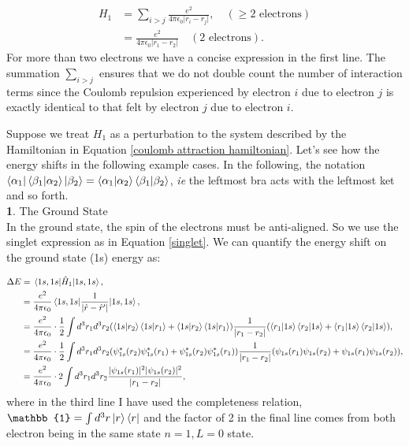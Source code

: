 \documentclass{article}
\numberwithin{equation}{section} %
\begin{document}
\begin{equation}
\begin{split}
H_1&=\sum_{i>j} \frac{e^2}{4\pi\epsilon_0\vert r_i-r_j\vert}, \quad (\geq \text{2 electrons})\\
&= \frac{e^2}{4\pi\epsilon_0\vert r_1-r_2\vert} \quad (\text{2 electrons}).
\end{split}
\end{equation}
For more than two electrons we have a concise expression in the first line. The summation $\sum_{i>j}$ ensures that we do not double count the number of interaction terms since the Coulomb repulsion experienced by electron $i$ due to electron $j$ is exactly identical to that felt by electron $j$ due to electron $i$.

Suppose we treat $H_1$ as a perturbation to the system described by the Hamiltonian in Equation \ref{coulomb attraction hamiltonian}. Let's see how the energy shifts in the following example cases. In the following, the notation $\bra{\alpha_1}\bra{\beta_1} \ket{\alpha_2}\ket{\beta_2} = \bra{\alpha_1}\ket{\alpha_2}\bra{\beta_1}\ket{\beta_2}$, \textit{ie} the leftmost bra acts with the leftmost ket and so forth.\\

\noindent\textbf{1}. The Ground State\\

In the ground state, the spin of the electrons must be anti-aligned. So we use the singlet expression as in Equation \ref{singlet}. We can quantify the energy shift on the ground state (1s) energy as:

\begin{equation}
\begin{split}
\Delta E&=\mel{1s,1s}{\hat{H}_1}{1s,1s},\\
&= \frac{e^2}{4\pi\epsilon_0}\mel{1s,1s}{\frac{1}{\vert \hat{r}-\hat{r}'\vert}}{1s,1s},\\
&=\frac{e^2}{4\pi\epsilon_0}\cdot \frac{1}{2}\int d^3r_1d^3r_2 (\bra{1s}\ket{r_2}\bra{1s}\ket{r_1} + \bra{1s}\ket{r_2}\bra{1s}\ket{r_1})\frac{1}{\vert r_1-r_2\vert}(\bra{r_1}\ket{1s}\bra{r_2}\ket{1s} + \bra{r_1}\ket{1s}\bra{r_2}\ket{1s}),\\
&=\frac{e^2}{4\pi\epsilon_0}\cdot \frac{1}{2}\int d^3r_1d^3r_2 (\psi^*_{1s}(r_2)\psi^*_{1s}(r_1) + \psi^*_{1s}(r_2)\psi^*_{1s}(r_1))\frac{1}{\vert r_1-r_2\vert}(\psi_{1s}(r_1)\psi_{1s}(r_2) + \psi_{1s}(r_1)\psi_{1s}(r_2)),\\
&=\frac{e^2}{4\pi\epsilon_0}\cdot 2\int d^3r_1d^3r_2  \frac{\vert\psi_{1s}(r_1)\vert^2\vert\psi_{1s}(r_2)\vert^2}{\vert r_1-r_2\vert},\\
\end{split}
\end{equation}
where in the third line I have used the completeness relation, $\mathbb{1}=\int d^3r \ket{r}\bra{r}$ and the factor of 2 in the final line comes from both electron being in the same state $n=1, L=0$ state.
\end{document}
